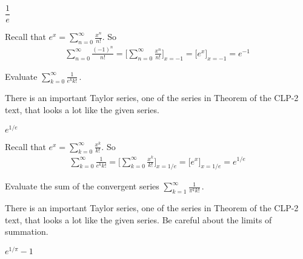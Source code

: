 \begin{answer}
$\dfrac{1}{e}$
\end{answer}

\begin{solution}
Recall that $e^x =\displaystyle \sum\limits_{n=0}^\infty\frac{x^n}{n!}$. So
\begin{align*}
\sum_{n=0}^\infty\frac{(-1)^n}{n!}
=\Big[\sum_{n=0}^\infty\frac{x^n}{n!}\Big]_{x=-1}
=\Big[e^x\Big]_{x=-1}
=e^{-1}
\end{align*}
\end{solution}


\begin{Mquestion}[M105 2013A]
Evaluate ${\displaystyle\sum_{k=0}^\infty\frac{1}{e^k k!}}\,$.
\end{Mquestion}

\begin{hint}
There is an important Taylor series, one of the series in
Theorem  of the
CLP-2 text, that looks a lot like the given series.
\end{hint}

\begin{answer}
$e^{1/e}$
\end{answer}

\begin{solution}
Recall that $e^x = \displaystyle\sum\limits_{k=0}^\infty\frac{x^k}{k!}$. So
\begin{align*}
\sum_{k=0}^\infty\frac{1}{e^k k!}
=\Big[\sum_{k=0}^\infty\frac{x^k}{k!}\Big]_{x=1/e}
=\Big[e^x\Big]_{x=1/e}
=e^{1/e}
\end{align*}
\end{solution}

\begin{question}[M105 2013A]
Evaluate the sum of the convergent series
${\displaystyle\sum_{k=1}^\infty\frac{1}{\pi^k k!}}\,$.
\end{question}

\begin{hint}
There is an important Taylor series, one of the series in
Theorem  of the
CLP-2 text, that looks a lot like the given series. Be careful about the
limits of summation.
\end{hint}

\begin{answer}
$e^{1/\pi}-1$
\end{answer}

